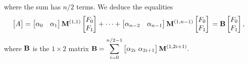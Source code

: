 \documentclass{elsart}
\begin{document}
where the sum has $n/2$ terms. We deduce the equalities
$$
\left [ \begin{matrix} A \end{matrix} \right ] =  
\left [ \begin{matrix} \alpha_0 & \alpha_1 \end{matrix} \right ] {\bf M}^{(1,1)}
            \left [ \begin{matrix} F_0 \\ F_1 \end{matrix} \right ]  + \cdots + 
            \left [ \begin{matrix} \alpha_{n-2} & \alpha_{n-1} \end{matrix} \right ] {\bf M}^{(1,n-1)}
            \left [ \begin{matrix} F_0 \\ F_1 \end{matrix} \right ] \\
= {\bf B} \left [ \begin{matrix} F_0 \\ F_1 \end{matrix} \right ],$$
where $\bf B$ is the $1 \times 2$ matrix
$\displaystyle{
{\bf B} = \sum_{i=0}^{n/2-1} \left [ \begin{matrix} \alpha_{2i} \
    \alpha_{2i+1}  \end{matrix} \right ] {\bf M}^{(1,2i+1)}.
}$
\end{document}
